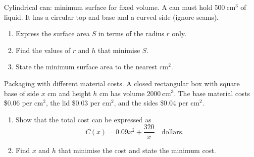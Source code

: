 \documentclass[11pt]{article}
\def\textbf#1{#1}%
\newcounter{question}
\begin{document}
\begin{question}
\textbf{Cylindrical can: minimum surface for fixed volume.}
A can must hold $500\ \text{cm}^3$ of liquid. It has a circular top and base and a curved side (ignore seams).
\begin{enumerate}
  \item Express the surface area $S$ in terms of the radius $r$ only.
  \item Find the values of $r$ and $h$ that minimise $S$.
  \item State the minimum surface area to the nearest $\text{cm}^2$.
\end{enumerate}

\begin{center}
\end{center}
\end{question}

\begin{question}
\textbf{Packaging with different material costs.}
A closed rectangular box with square base of side $x$ cm and height $h$ cm has volume $2000\ \text{cm}^3$.
The base material costs \$0.06 per $\text{cm}^2$, the lid \$0.03 per $\text{cm}^2$, and the sides \$0.04 per $\text{cm}^2$.
\begin{enumerate}
  \item Show that the total cost can be expressed as
  \[
     C(x)=0.09x^2+\frac{320}{x}\quad\text{dollars}.
  \]
  \item Find $x$ and $h$ that minimise the cost and state the minimum cost.
\end{enumerate}

\begin{center}
\end{center}
\end{question}
\end{document}
